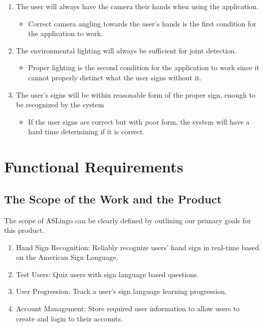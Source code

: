 \documentclass[12pt, titlepage]{article}
\begin{document}
\begin{enumerate}
    \item The user will always have the camera their hands when using the application.
    \begin{itemize}
        \item[] Correct camera angling towards the user's hands is the first condition for the application to work.
    \end{itemize}
    \item The environmental lighting will always be sufficient for joint detection.
    \begin{itemize}
        \item[] Proper lighting is the second condition for the application to work since it cannot properly distinct what the user signs without it.
    \end{itemize}
    \item The user's signs will be within reasonable form of the proper sign, enough to be recognized by the system
    \begin{itemize}
        \item[] If the user signs are correct but with poor form, the system will have a hard time determining if it is correct.
    \end{itemize}
\end{enumerate}

\section{Functional Requirements}

\subsection{The Scope of the Work and the Product}
The scope of ASLingo can be clearly defined by outlining our primary goals for this product.

\begin{enumerate}
  \item Hand Sign Recognition: Reliably recognize users' hand sign in real-time based on the American Sign Language.
  \item Test Users: Quiz users with sign language based questions.
  \item User Progression: Track a user's sign language learning progression.
  \item Account Management: Store required user information to allow users to create and login to their accounts.
\end{enumerate}
\end{document}
